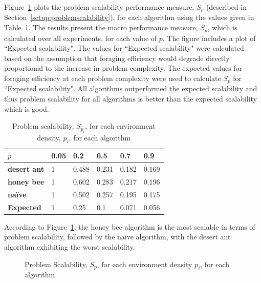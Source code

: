Figure~\ref{fig:problemscalability} plots the problem scalability performance measure, $S_p$ (described in Section~\ref{setup:problemscalability}), for each algorithm using the values given in Table~\ref{table:problemscalability}. The results present the macro performance measure, $S_p$, which is calculated over all experiments, for each value of $p$. The figure includes a plot of ``Expected scalability". The values for ``Expected scalability" were calculated based on the assumption that foraging efficiency would degrade directly proportional to the increase in problem complexity. The expected values for foraging efficiency at each problem complexity were used to calculate $S_p$ for ``Expected scalability". All algorithms outperformed the expected scalability and thus problem scalability for all algorithms is better than the expected scalability which is good. 


\begin{table}[!htbp]
    \centering
    \caption{Problem scalability, $S_{p_i}$, for each environment density, $p_i$, for each algorithm}
    \label{table:problemscalability}
    \begin{tabular}{@{}llllll@{}}
    \toprule
    \textbf{$p$}                  & \textbf{0.05} & \textbf{0.2        } & \textbf{0.5}         & \textbf{0.7}         & \textbf{0.9}         \\ \midrule
    \textbf{desert ant}           & 1    & 0.488 & 0.231 & 0.182 & 0.169 \\
    \textbf{honey bee}            & 1    & 0.602 & 0.283 & 0.217 & 0.196 \\
    \textbf{na\"ive}              & 1    & 0.502 & 0.257 & 0.195 & 0.175 \\
    \textbf{Expected} & 1    & 0.25        & 0.1         & 0.071 & 0.056 \\ \bottomrule
    \end{tabular}
\end{table}

According to Figure~\ref{fig:problemscalability}, the honey bee algorithm is the most scalable in terms of problem scalability, followed by the na\"ive algorithm, with the desert ant algorithm exhibiting the worst scalability.


\begin{figure}[!htbp]
    \centering
    \resizebox{\textwidth}{!}{}
    \caption{Problem Scalability, $S_p$, for each environment density $p_i$, for each algorithm}
    \label{fig:problemscalability}
\end{figure}
    

